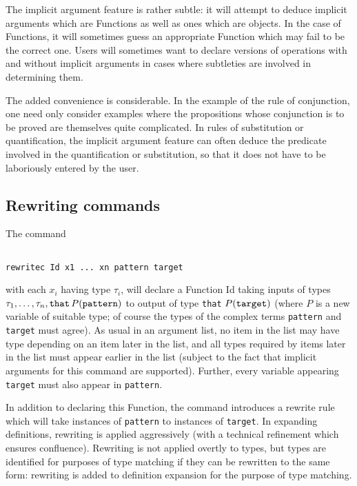 \documentclass[12pt]{article}
\begin{document}
The implicit argument feature is rather subtle:  it will attempt to deduce implicit arguments which are Functions as well as ones which are objects.  In the case of Functions, it will sometimes
guess an appropriate Function which may fail to be the correct one.  Users will sometimes want to declare versions of operations with and without implicit arguments in cases where subtleties are involved in determining them.

The added convenience is considerable.  In the example of the rule of conjunction, one need only consider examples where the propositions whose conjunction is to be proved are themselves quite complicated.  In rules of substitution or quantification, the implicit argument feature can often deduce the predicate involved in the quantification or substitution, so that it does not have to be laboriously entered by the user.

\subsection{Rewriting commands}

The command 

\begin{verbatim}

rewritec Id x1 ... xn pattern target

\end{verbatim}

with each $x_i$ having type $\tau_i$, will declare a Function Id taking inputs of types $\tau_1,\ldots,\tau_n,{\tt that}\,P({\tt pattern})$ to output of type {\tt that} $P({\tt target})$ (where $P$ is a new variable of suitable type;  of course the types of the complex terms {\tt pattern} and {\tt target} must agree).  As usual in an argument list, no item in the list may have type depending on an item later in the list, and all types
required by items later in the list must appear earlier in the list (subject to the fact that implicit arguments for this command are supported).  Further, every variable appearing {\tt target} must also appear in {\tt pattern}.

In addition to declaring this Function, the command introduces a rewrite rule which will take instances of {\tt pattern} to instances of {\tt target}.  In expanding definitions, rewriting is applied aggressively (with a technical refinement which ensures confluence).  Rewriting is not applied overtly to types, but types are identified for purposes of type matching if they can be rewritten to the same form:  rewriting is added to definition expansion for the purpose of type matching.
\end{document}
